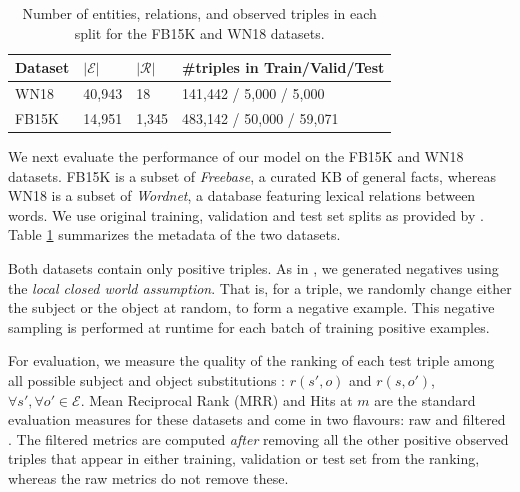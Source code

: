 \documentclass{article}
\newcommand{\ObsTensor}{\mathbf{Y}}
\newcommand{\EntitySpace}{\mathcal{E}}
\newcommand{\RelationSpace}{\mathcal{R}}
\newcommand{\setent}{\mathcal{E}} %
\begin{document}
\begin{table}[h]
    \centering
    \begin{tabular}{l|lll}
        Dataset & $|\EntitySpace|$ & $|\RelationSpace|$ & \#triples in Train/Valid/Test \\ \hline
        WN18 & 40,943 & 18 & 141,442 / 5,000 / 5,000 \\
        FB15K & 14,951 & 1,345 & 483,142 / 50,000 / 59,071 \\
    \end{tabular}
    \caption{Number of entities, relations, and observed triples in each split for the FB15K and WN18 datasets.}
    \label{tab:fb15k_wn18_meta}
\end{table}


We next evaluate the performance of our model on the FB15K and WN18 datasets. FB15K is a subset of \emph{Freebase}, a curated KB of general facts, whereas WN18 is a subset of \emph{Wordnet}, a database featuring lexical relations between words.  We use original training, validation and test set splits as provided by \citet{bordes2013translating}. Table \ref{tab:fb15k_wn18_meta} summarizes the metadata of the two datasets.



Both datasets contain only positive triples. As in \citet{bordes2013translating}, we generated negatives using the \emph{local closed world assumption}. That is, for a triple, we randomly change either the subject or the object at random, to form a negative example. 
 This negative sampling is performed at runtime for each batch of training positive examples. 


For evaluation, we measure the quality of the ranking of each test triple among all possible subject and object substitutions
: $r(s',o)$ and $r(s,o')$, $\forall s', \forall o' \in \setent$.
 Mean Reciprocal Rank (MRR) and Hits at $m$ are the standard evaluation measures for these datasets and come in two flavours: raw and filtered \cite{bordes2013translating}. The filtered metrics are computed \emph{after} removing all the other positive observed triples that appear in either training, validation or test set from the ranking, whereas the raw metrics do not remove these. %
\end{document}
